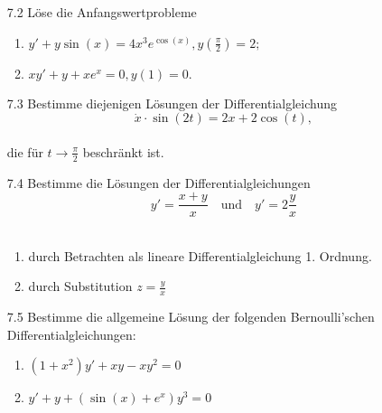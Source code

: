 \documentclass{HM}
\begin{document}
	\begin{enumerate}
		\item[7.2] Löse die Anfangswertprobleme
		\begin{enumerate}
			\item $y'+y\sin(x)=4x^3e^{\cos(x)}, y(\frac{\pi}{2})=2;$
			\item $xy'+y+xe^x=0, y(1)=0.$
		\end{enumerate}
		
		\item[7.3] Bestimme diejenigen Lösungen der Differentialgleichung
		$$\dot{x}\cdot\sin(2t)=2x+2\cos(t),$$\\
		die für $t\to\frac{\pi}{2}$ beschränkt ist.
		
		\item[7.4] Bestimme die Lösungen der Differentialgleichungen
		$$y'=\frac{x+y}{x} \quad\text{und}\quad y'=2\frac{y}{x}$$\\
		\begin{enumerate}
			\item durch Betrachten als lineare Differentialgleichung 1. Ordnung.
			\item durch Substitution $z=\frac{y}{x}$
		\end{enumerate}
		
		\item[7.5] Bestimme die allgemeine Lösung der folgenden Bernoulli'schen Differentialgleichungen:
		\begin{enumerate}
			\item $(1+x^2)y'+xy-xy^2=0$
			\item $y'+y+(\sin(x)+e^x)y^3=0$
		\end{enumerate}
	\end{enumerate}
\end{document}
